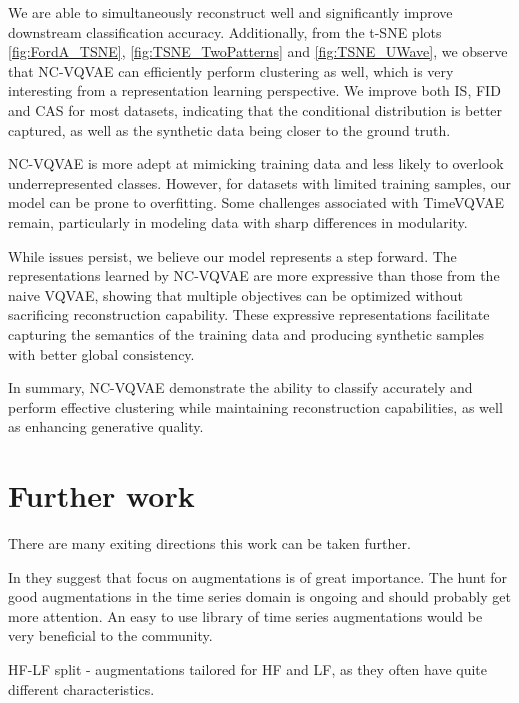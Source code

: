 \documentclass[../../thesis.tex]{subfiles}
\begin{document}
We are able to simultaneously reconstruct well and significantly improve downstream classification accuracy. Additionally, from the t-SNE plots \ref{fig:FordA_TSNE}, \ref{fig:TSNE_TwoPatterns} and \ref{fig:TSNE_UWave}, we observe that NC-VQVAE can efficiently perform clustering as well, which is very interesting from a representation learning perspective. We improve both IS, FID and CAS for most datasets, indicating that the conditional distribution is better captured, as well as the synthetic data being closer to the ground truth.\newline

NC-VQVAE is more adept at mimicking training data and less likely to overlook underrepresented classes. However, for datasets with limited training samples, our model can be prone to overfitting. Some challenges associated with TimeVQVAE remain, particularly in modeling data with sharp differences in modularity.\newline

While issues persist, we believe our model represents a step forward. The representations learned by NC-VQVAE are more expressive than those from the naive VQVAE, showing that multiple objectives can be optimized without sacrificing reconstruction capability. These expressive representations facilitate capturing the semantics of the training data and producing synthetic samples with better global consistency.\newline

In summary, NC-VQVAE demonstrate the ability to classify accurately and perform effective clustering while maintaining reconstruction capabilities, as well as enhancing generative quality.



\section{Further work}
There are many exiting directions this work can be taken further.

In \cite{morningstar2024augmentations} they suggest that focus on augmentations is of great importance. The hunt for good augmentations in the time series domain is ongoing and should probably get more attention. An easy to use library of time series augmentations would be very beneficial to the community.\newline

HF-LF split - augmentations tailored for HF and LF, as they often have quite different characteristics.\newline
\end{document}
